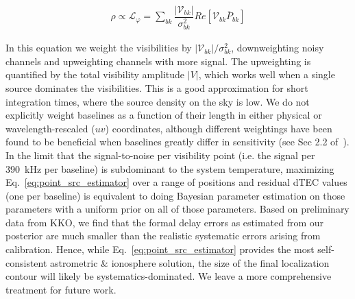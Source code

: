 \begin{align}
    \rho \propto \mathcal{L}_\varphi = \sum_{bk} \dfrac{|\mathcal{V}_{bk}|}{\sigma_{bk}^2}Re[\mathcal{V}_{bk}\overline{P}_{bk}]\label{eq:point_src_estimator}
\end{align}

In this equation we weight the visibilities by $|\mathcal{V}_{bk}| / \sigma_{bk}^2$, downweighting noisy channels and upweighting channels with more signal. The upweighting is quantified by the total visibility amplitude $|V|$, which works well when a single source dominates the visibilities. This is a good approximation for short integration times, where the source density on the sky is low. We do not explicitly weight baselines as a function of their length in either physical or wavelength-rescaled ($uv$) coordinates, although different
weightings have been found to be beneficial when baselines greatly differ in sensitivity (see Sec 2.2 of~\citep{jackson2022sub}). In the limit that the signal-to-noise per visibility point (i.e. the signal per \SI{390}{\kilo\hertz} per baseline) is subdominant to the system temperature, maximizing Eq.~\ref{eq:point_src_estimator} over a range of positions and residual dTEC values (one per baseline) is equivalent to doing Bayesian parameter estimation on those parameters with a uniform prior on
all of those parameters. Based on preliminary data from KKO, we find that the formal delay errors as estimated from our posterior are much smaller than the realistic systematic errors arising from calibration. Hence, while Eq.~\ref{eq:point_src_estimator} provides the most self-consistent astrometric \& ionosphere solution, the size of the final localization contour will likely be systematics-dominated. We leave a more comprehensive treatment for future work. 

